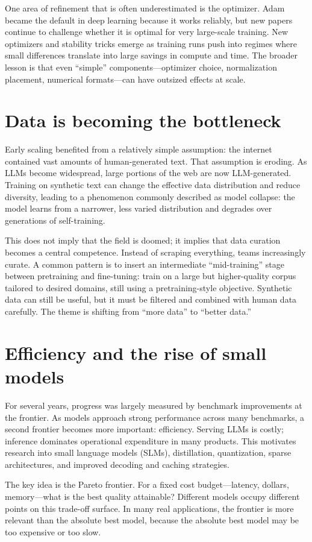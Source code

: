 One area of refinement that is often underestimated is the optimizer. Adam became the default in deep learning because it works reliably, but new papers continue to challenge whether it is optimal for very large-scale training. New optimizers and stability tricks emerge as training runs push into regimes where small differences translate into large savings in compute and time. The broader lesson is that even “simple” components—optimizer choice, normalization placement, numerical formats—can have outsized effects at scale.

\section{Data is becoming the bottleneck}
Early scaling benefited from a relatively simple assumption: the internet contained vast amounts of human-generated text. That assumption is eroding. As LLMs become widespread, large portions of the web are now LLM-generated. Training on synthetic text can change the effective data distribution and reduce diversity, leading to a phenomenon commonly described as model collapse: the model learns from a narrower, less varied distribution and degrades over generations of self-training.

This does not imply that the field is doomed; it implies that data curation becomes a central competence. Instead of scraping everything, teams increasingly curate. A common pattern is to insert an intermediate “mid-training” stage between pretraining and fine-tuning: train on a large but higher-quality corpus tailored to desired domains, still using a pretraining-style objective. Synthetic data can still be useful, but it must be filtered and combined with human data carefully. The theme is shifting from “more data” to “better data.”

\section{Efficiency and the rise of small models}
For several years, progress was largely measured by benchmark improvements at the frontier. As models approach strong performance across many benchmarks, a second frontier becomes more important: efficiency. Serving LLMs is costly; inference dominates operational expenditure in many products. This motivates research into small language models (SLMs), distillation, quantization, sparse architectures, and improved decoding and caching strategies.

The key idea is the Pareto frontier. For a fixed cost budget—latency, dollars, memory—what is the best quality attainable? Different models occupy different points on this trade-off surface. In many real applications, the frontier is more relevant than the absolute best model, because the absolute best model may be too expensive or too slow.

